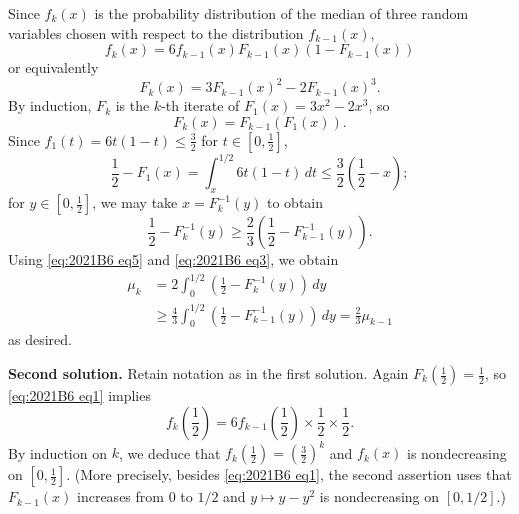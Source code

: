 \documentclass[amssymb,twocolumn,pra,10pt,aps]{revtex4-1}
\begin{document}
\begin{itemize}
Since $f_k(x)$ is the probability distribution of the median of three random variables chosen with respect to the distribution $f_{k-1}(x)$,
\begin{equation} \label{eq:2021B6 eq1}
f_k(x) = 6 f_{k-1}(x) F_{k-1}(x) ( 1-F_{k-1}(x) )
\end{equation}
or equivalently
\begin{equation} \label{eq:2021B6 eq2}
F_k(x) = 3 F_{k-1}(x)^2 - 2 F_{k-1}(x)^3.
\end{equation}
By induction, $F_k$ is the $k$-th iterate of $F_1(x) = 3x^2 -2x^3$, so
\begin{equation} \label{eq:2021B6 eq5}
F_k(x) = F_{k-1}(F_1(x)).
\end{equation}
Since $f_1(t) = 6t(1-t) \leq \frac{3}{2}$ for $t \in [0,\frac{1}{2}]$,
\[
\frac{1}{2} - F_1(x) = \int_x^{1/2} 6t(1-t)\,dt \leq \frac{3}{2}\left(\frac{1}{2}-x\right);
\]
for $y \in [0, \frac{1}{2}]$, we may take $x = F_{k}^{-1}(y)$ to obtain
\begin{equation} \label{eq:2021B6 eq3}
\frac{1}{2} - F_k^{-1}(y) \geq \frac{2}{3} \left( \frac{1}{2} - F_{k-1}^{-1}(y) \right).
\end{equation}
Using \eqref{eq:2021B6 eq5} and \eqref{eq:2021B6 eq3}, we obtain
\begin{align*}
\mu_k &= 2 \int_0^{1/2} \left( \frac{1}{2} - F_k^{-1}(y) \right) \,dy \\
&\geq \frac{4}{3} \int_0^{1/2} \left( \frac{1}{2} - F_{k-1}^{-1}(y) \right) \,dy = \frac{2}{3}\mu_{k-1}
\end{align*}
as desired.

\noindent
\textbf{Second solution.}
Retain notation as in the first solution. Again $F_k(\frac{1}{2}) = \frac{1}{2}$, so \eqref{eq:2021B6 eq1} implies
\[
f_k\left( \frac{1}{2} \right) = 6 f_{k-1} \left( \frac{1}{2} \right) \times \frac{1}{2} \times \frac{1}{2}.
\]
By induction on $k$, we deduce that %
$f_k(\frac{1}{2}) = (\frac{3}{2})^k$
and $f_k(x)$ is nondecreasing on $[0,\frac{1}{2}]$.
(More precisely, besides \eqref{eq:2021B6 eq1}, the second assertion uses that $F_{k-1}(x)$ increases from $0$ to $1/2$
and $y \mapsto y - y^2$ is nondecreasing on $[0, 1/2]$.)


\end{itemize}
\end{document}
